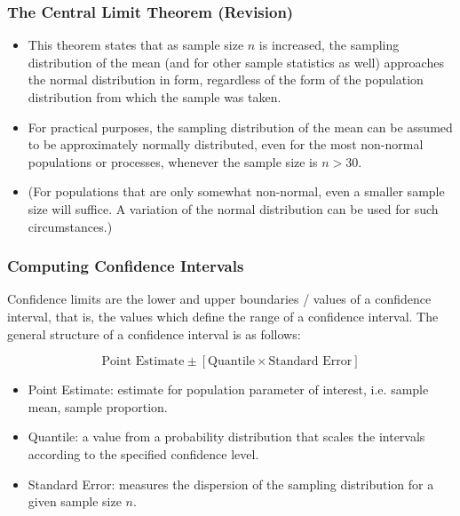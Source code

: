 \documentclass[a4]{beamer}
\begin{document}
\begin{frame}
\frametitle{The Central Limit Theorem (Revision) }
\begin{itemize}
\item This theorem states that as sample size $n$ is increased, the sampling distribution of the mean (and for other sample statistics as well) approaches the normal distribution in form, regardless of the form of the population distribution from
which the sample was taken.

\item For practical purposes, the sampling distribution of the mean can be assumed to be
approximately normally distributed, even for the most non-normal populations or processes, whenever the
sample size is $n > 30$.

\item (For populations that are only somewhat non-normal, even a smaller sample size will
suffice. A variation of the normal distribution can be used for such circumstances.)
\end{itemize}


\end{frame}


\begin{frame}
\frametitle{Computing Confidence Intervals}
Confidence limits are the lower and upper boundaries / values of a confidence interval, that is, the values which define the range of a confidence interval. The general structure of a confidence interval is as follows:

\[ \mbox{Point Estimate}  \pm \left[ \mbox{Quantile} \times \mbox{Standard Error} \right] \]


\begin{itemize}
\item Point Estimate: estimate for population parameter of interest, i.e. sample mean, sample proportion.
\item Quantile: a value from a probability distribution that scales the intervals according to the specified confidence level.
\item Standard Error: measures the dispersion of the sampling distribution for a given sample size $n$.
\end{itemize}
\end{frame}



\end{document}
